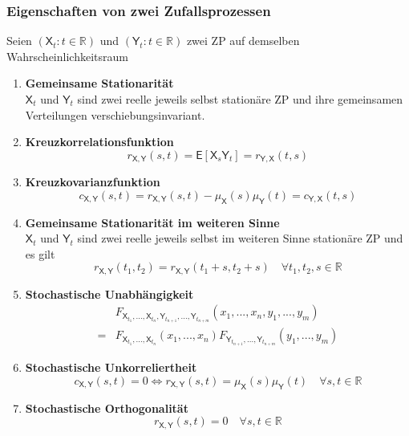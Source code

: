 \documentclass[a4paper,twocolumn,10pt]{article}
\newenvironment{iii}{\begin{enumerate}[label={\roman{*})}]}{\end{enumerate}}
\newcommand{\erw}{\mathsf{E}}
\begin{document}
\subsubsection*{Eigenschaften von zwei Zufallsprozessen} 
Seien $(\mathsf{X}_{t}: t \in \mathbb{R})$ und $(\mathsf{Y}_{t}: t \in \mathbb{R})$ zwei ZP auf demselben Wahrscheinlichkeitsraum
\begin{iii}
\item \textbf{Gemeinsame Stationarität} \\ $\mathsf{X}_{t}$ und $\mathsf{Y}_{t}$ sind zwei reelle jeweils selbst stationäre ZP und ihre gemeinsamen Verteilungen verschiebungsinvariant.
\item \textbf{Kreuzkorrelationsfunktion}
\[ r_{\mathsf{X,Y}}(s,t) = \erw[\mathsf{X}_{s} \mathsf{Y}_{t}] = r_{\mathsf{Y,X}}(t,s) \]
\item \textbf{Kreuzkovarianzfunktion}
\[ c_{\mathsf{X,Y}}(s,t) =r_{\mathsf{X,Y}}(s,t) - \mu_{\mathsf{X}}(s) \mu_{\mathsf{Y}}(t) = c_{\mathsf{Y,X}}(t,s) \]
\item \textbf{Gemeinsame Stationarität im weiteren Sinne} \\$\mathsf{X}_{t}$ und $\mathsf{Y}_{t}$ sind zwei reelle jeweils selbst im weiteren Sinne stationäre ZP und es gilt
\[ r_{\mathsf{X,Y}}(t_1,t_2) = r_{\mathsf{X,Y}}(t_1+s,t_2+s) \quad \forall t_1,t_2,s \in \mathbb{R}\]
\item \textbf{Stochastische Unabhängigkeit}
\begin{equation*}
\begin{split}
&F_{\mathsf{X}_{t_1},...,\mathsf{X}_{t_n},\mathsf{Y}_{t_{n+1}},...,\mathsf{Y}_{t_{n+m}}}(x_1,...,x_n,y_1,...,y_m)\\
=&F_{\mathsf{X}_{t_1},...,\mathsf{X}_{t_n}}(x_1,...,x_n)F_{\mathsf{Y}_{t_{n+1}},...,\mathsf{Y}_{t_{n+m}}}(y_1,...,y_m)
\end{split}
\end{equation*}
\item \textbf{Stochastische Unkorreliertheit} 
\[ c_{\mathsf{X,Y}}(s,t) = 0 \Leftrightarrow r_{\mathsf{X,Y}}(s,t) = \mu_{\mathsf{X}}(s) \mu_{\mathsf{Y}}(t) \quad \forall s,t \in \mathbb{R} \]
\item \textbf{Stochastische Orthogonalität}
\[ r_{\mathsf{X,Y}}(s,t) = 0 \quad \forall s, t \in \mathbb{R}\]
\end{iii}
\end{document}
